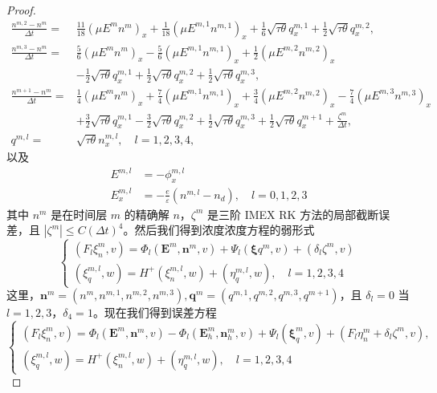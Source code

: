 \begin{proof}
\begin{equation}
\begin{split}
            \frac{n^{m,2} - n^m}{\Delta t} = & \frac{11}{18} (\mu E^m n^m)_x + \frac{1}{18} (\mu E^{m,1} n^{m,1})_x + \frac{1}{6} \sqrt{\tau \theta} q_x^{m,1} + \frac{1}{2} \sqrt{\tau \theta} q_x^{m,2}, \\
            \frac{n^{m,3} - n^m}{\Delta t} = & \frac{5}{6} (\mu E^m n^m)_x - \frac{5}{6} (\mu E^{m,1} n^{m,1})_x + \frac{1}{2} (\mu E^{m,2} n^{m,2})_x \\
            & -\frac{1}{2} \sqrt{\tau \theta} q_x^{m,1} + \frac{1}{2} \sqrt{\tau \theta} q_x^{m,2} + \frac{1}{2} \sqrt{\tau \theta} q_x^{m,3}, \\
            \frac{n^{m+1} - n^m}{\Delta t} = & \frac{1}{4} (\mu E^m n^m)_x + \frac{7}{4} (\mu E^{m,1} n^{m,1})_x + \frac{3}{4} (\mu E^{m,2} n^{m,2})_x - \frac{7}{4} (\mu E^{m,3} n^{m,3})_x \\
            & +\frac{3}{2} \sqrt{\tau \theta} q_x^{m,1} - \frac{3}{2} \sqrt{\tau \theta} q_x^{m,2} + \frac{1}{2} \sqrt{\tau \theta} q_x^{m,3} + \frac{1}{2} \sqrt{\tau \theta} q_x^{m+1} + \frac{\zeta^m}{\Delta t}, \\
            q^{m,l} = & \sqrt{\tau \theta} n_x^{m,l}, \quad l=1,2,3,4,
        \end{split}
    \end{equation}
    以及
    \begin{equation}
        \begin{split}
            E^{m,l} & = -\phi_x^{m,l} \\
            E_x^{m,l} & = -\frac{e}{\varepsilon} (n^{m,l} - n_d), \quad l=0,1,2,3
        \end{split}
    \end{equation}
    其中 $n^m$ 是在时间层 $m$ 的精确解 $n$，$\zeta^m$ 是三阶 IMEX RK 方法的局部截断误差，且 $|\zeta^m| \leq C(\Delta t)^4$。然后我们得到浓度浓度方程的弱形式
    $$
        \left\{\begin{array}{l}
            (F_l \xi_n^m, v) = \Phi_l (\boldsymbol{E}^m, \boldsymbol{n}^m, v) + \Psi_l (\boldsymbol{\xi}q^m, v) + (\delta_l \zeta^m, v) \\
            (\xi_q^{m,l}, w) = H^+ (\xi_n^{m,l}, w) + (\eta_q^{m,l}, w), \quad l=1,2,3,4
        \end{array}\right.
    $$
    这里，$\boldsymbol{n}^m = (n^m, n^{m,1}, n^{m,2}, n^{m,3}), \boldsymbol{q}^m = (q^{m,1}, q^{m,2}, q^{m,3}, q^{m+1})$，且 $\delta_l = 0$ 当 $l=1,2,3$，$\delta_4 = 1$。现在我们得到误差方程
    $$
        \left\{\begin{array}{l}
            \left(F_{l} \xi_{n}^{m}, v\right)=\Phi_{l}\left(\boldsymbol{E}^{m}, \boldsymbol{n}^{m}, v\right)-\Phi_{l}\left(\boldsymbol{E}_{h}^{m}, \boldsymbol{n}_{h}^{m}, v\right)+\Psi_{l}\left(\boldsymbol{\xi}_{q}^{m}, v\right)+\left(F_{l} \eta_{n}^{m}+\delta_{l} \zeta^{m}, v\right), \\
            \left(\xi_{q}^{m, l}, w\right)=H^{+}\left(\xi_{n}^{m, l}, w\right)+\left(\eta_{q}^{m, l}, w\right), \quad l=1,2,3,4
        \end{array}\right.
    $$


\end{proof}
